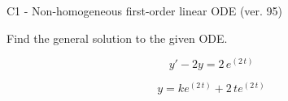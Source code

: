 \begin{exercise}
  \begin{exerciseTitle}C1 - Non-homogeneous first-order linear ODE (ver. 95)\end{exerciseTitle}
  \begin{exerciseStatement}
    
Find the general solution to the given ODE.

    
\[y'-2y= 2 \, e^{\left(2 \, t\right)}\]

  \end{exerciseStatement}
  \begin{exerciseAnswer}
    
\[y= k e^{\left(2 \, t\right)} + 2 \, t e^{\left(2 \, t\right)}\]

  \end{exerciseAnswer}
\end{exercise}